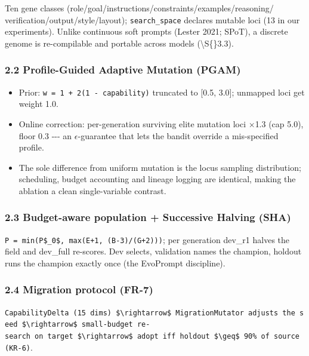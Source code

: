 Ten gene classes (role/goal/instructions/constraints/examples/reasoning/ verification/output/style/layout); \texttt{search\_space} declares mutable loci (13 in our experiments). Unlike continuous soft prompts (Lester 2021; SPoT), a discrete genome is re-compilable and portable across models (\textbackslash S\{\}3.3).

\subsubsection{2.2 Profile-Guided Adaptive Mutation (PGAM)}\label{22-profile-guided-adaptive-mutation-pgam}

\begin{itemize}
\tightlist
\item
  Prior: \texttt{w\ =\ 1\ +\ 2(1\ -\ capability)} truncated to {[}0.5, 3.0{]}; unmapped loci get weight 1.0.
\item
  Online correction: per-generation surviving elite mutation loci \(\times\)1.3 (cap 5.0), floor 0.3 -\/-\/- an \(\epsilon\)-guarantee that lets the bandit override a mis-specified profile.
\item
  The sole difference from uniform mutation is the locus sampling distribution; scheduling, budget accounting and lineage logging are identical, making the ablation a clean single-variable contrast.
\end{itemize}

\subsubsection{2.3 Budget-aware population + Successive Halving (SHA)}\label{23-budget-aware-population--successive-halving-sha}

\texttt{P\ =\ min(P\$\_0\$,\ max(E+1,\ (B-3)/(G+2)))}; per generation dev\_r1 halves the field and dev\_full re-scores. Dev selects, validation names the champion, holdout runs the champion exactly once (the EvoPrompt discipline).

\subsubsection{2.4 Migration protocol (FR-7)}\label{24-migration-protocol-fr-7}

\texttt{CapabilityDelta\ (15\ dims)\ \$\textbackslash{}rightarrow\$\ MigrationMutator\ adjusts\ the\ seed\ \$\textbackslash{}rightarrow\$\ small-budget\ re-search\ on\ target\ \$\textbackslash{}rightarrow\$\ adopt\ iff\ holdout\ \$\textbackslash{}geq\$\ 90\%\ of\ source\ (KR-6)}.

